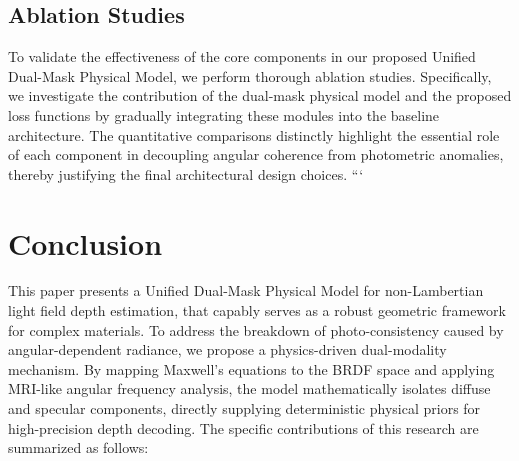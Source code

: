 \documentclass[lettersize,journal]{IEEEtran}
\begin{document}
\subsection{Ablation Studies}
To validate the effectiveness of the core components in our proposed Unified Dual-Mask Physical Model, we perform thorough ablation studies. Specifically, we investigate the contribution of the dual-mask physical model and the proposed loss functions by gradually integrating these modules into the baseline architecture. The quantitative comparisons distinctly highlight the essential role of each component in decoupling angular coherence from photometric anomalies, thereby justifying the final architectural design choices.
```

\section{Conclusion}

This paper presents a Unified Dual-Mask Physical Model for non-Lambertian light field depth estimation, that capably serves as a robust geometric framework for complex materials. To address the breakdown of photo-consistency caused by angular-dependent radiance, we propose a physics-driven dual-modality mechanism. By mapping Maxwell's equations to the BRDF space and applying MRI-like angular frequency analysis, the model mathematically isolates diffuse and specular components, directly supplying deterministic physical priors for high-precision depth decoding. The specific contributions of this research are summarized as follows:
\end{document}
